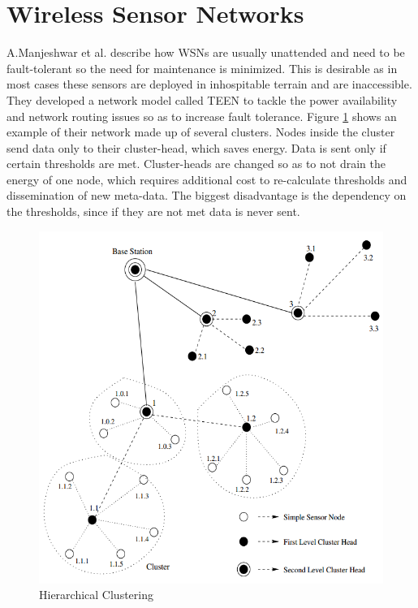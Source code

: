 \documentclass{mproj}
\begin{document}
\section{Wireless Sensor Networks}
A.Manjeshwar et al. \cite{teen} describe how WSNs are usually unattended and need to be fault-tolerant so the need for maintenance is minimized. This is desirable as in most cases these sensors are deployed in inhospitable terrain and are inaccessible. They developed a network model called TEEN to tackle the power availability and network routing issues so as to increase fault tolerance. Figure \ref{fig:teen} shows an example of their network made up of several clusters. Nodes inside the cluster send data only to their cluster-head, which saves energy. Data is sent only if certain thresholds are met. Cluster-heads are changed so as to not drain the energy of one node, which requires additional cost to re-calculate thresholds and dissemination of new meta-data. The biggest disadvantage is the dependency on the thresholds, since if they are not met data is never sent.

\begin{figure}[H]
\caption{Hierarchical Clustering \cite{teen}}
\label{fig:teen}
\centerline{\includegraphics[scale=0.5]{teen}}
\end{figure}
\end{document}
